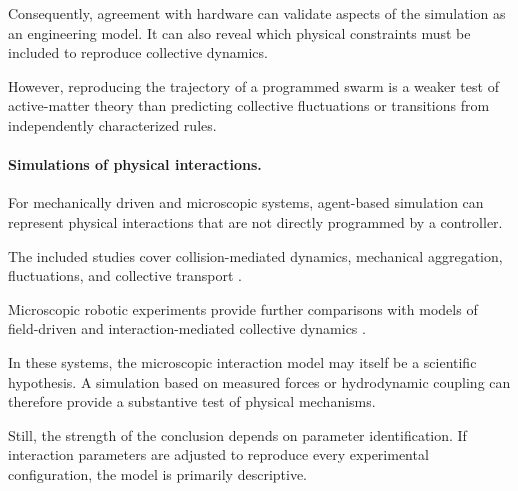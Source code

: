 Consequently,
agreement with hardware
can validate aspects
of the simulation
as an engineering
model. It can
also reveal which
physical constraints
must be included
to reproduce
collective dynamics.

However, reproducing
the trajectory of
a programmed swarm
is a weaker test
of active-matter theory
than predicting
collective fluctuations
or transitions
from independently
characterized rules.

\paragraph*{Simulations of physical interactions.}

For mechanically driven
and microscopic systems,
agent-based simulation
can represent physical
interactions that
are not directly
programmed by
a controller.

The included studies
cover collision-mediated
dynamics,
mechanical aggregation,
fluctuations,
and collective transport
\cite{Welch2018aggregatesuppressio,Welch2019activereorientation,Xi2024emergentintelligenc,GuzmnLastra2026emergenceofbeating,Edwards2026robusttopologically,Musacchio2026activeembracemente,Arbel2025amechanicalroutef,Baconnier2022selectiveandcollec,Casiulis2025ageometricconditio,Deblais2018boundariescontrolc,Boudet2022effectivetemperatur,Wang2025hyperuniformnetwork,Musacchio2026fluidizationinduced,Zion2023morphologicalcomput,Wagner2026geometryinducedtra,Zion2021distributedonline}.

Microscopic robotic experiments
provide further comparisons
with models of field-driven
and interaction-mediated
collective dynamics
\cite{Sun2021swarmingmicrodrople,Calabr2026interactiondrivena,Xie2020bioinspiredsoftmic,Pauer2021programmabledesign,Chen2024synchronousandfull,Yigit2019programmablecollect,McGovern2024multifunctionalchir,Feng2023weakionexchangeba,Sun2024multiplemagnetoopt,Liu2022bionicmorphological,Wang2018collectivebehavior,Baker2019shapeprogrammed3d,Goyal2025externallycontrolle,Aubret2018targetedassemblyan,Yan2024programmingstructur,Yigit2020cohesiveselforgani,Hanson2025electrokineticpropu,Law2024navigationofmagnet,Ceron2026fluidictorqueenabl,Li2022vectorcontrolledwh}.

In these systems,
the microscopic
interaction model
may itself be
a scientific
hypothesis.
A simulation
based on measured
forces or
hydrodynamic coupling
can therefore
provide a substantive
test of physical
mechanisms.

Still, the strength
of the conclusion
depends on parameter
identification.
If interaction
parameters are
adjusted to reproduce
every experimental
configuration,
the model is
primarily descriptive.

